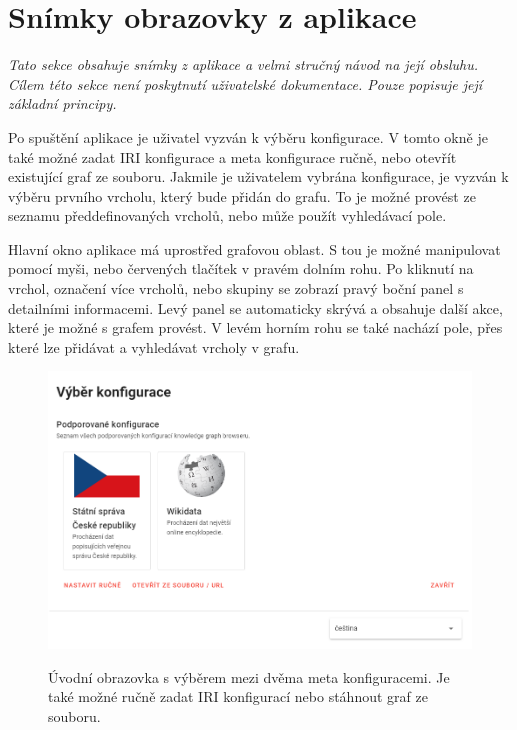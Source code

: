 \section{Snímky obrazovky z aplikace}
\textit{Tato sekce obsahuje snímky z aplikace a velmi stručný návod na její obsluhu. Cílem této sekce není poskytnutí uživatelské dokumentace. Pouze popisuje její základní principy.}

Po spuštění aplikace je uživatel vyzván k výběru konfigurace. V tomto okně je také možné zadat IRI konfigurace a meta konfigurace ručně, nebo otevřít existující graf ze souboru. Jakmile je uživatelem vybrána konfigurace, je vyzván k výběru prvního vrcholu, který bude přidán do grafu. To je možné provést ze seznamu předdefinovaných vrcholů, nebo může použít vyhledávací pole.

Hlavní okno aplikace má uprostřed grafovou oblast. S tou je možné manipulovat pomocí myši, nebo červených tlačítek v pravém dolním rohu. Po kliknutí na vrchol, označení více vrcholů, nebo skupiny se zobrazí pravý boční panel s detailními informacemi. Levý panel se automaticky skrývá a obsahuje další akce, které je možné s grafem provést. V levém horním rohu se také nachází pole, přes které lze přidávat a vyhledávat vrcholy v grafu.

\begin{figure}[h]
    \centering
    \includegraphics[width=\textwidth]{media/metaconfiguration.png}\\
    \caption{Úvodní obrazovka s výběrem mezi dvěma meta konfiguracemi. Je také možné ručně zadat IRI konfigurací nebo stáhnout graf ze souboru.}
\end{figure}

\newpage

